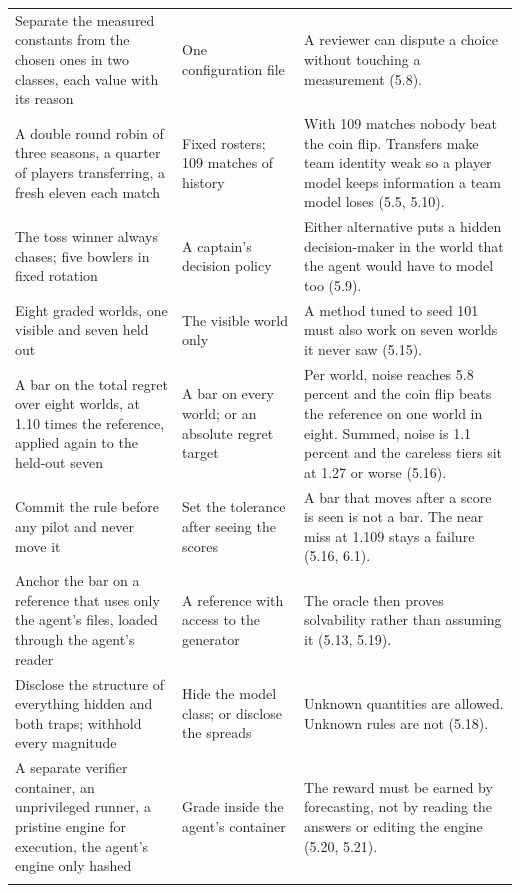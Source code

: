 \documentclass[11pt,letterpaper]{article}
\begin{document}
\begin{small}
\begin{longtable}{>{\raggedright\arraybackslash}p{}>{\raggedright\arraybackslash}p{}>{\raggedright\arraybackslash}p{}}
Separate the measured constants from the chosen ones in two classes, each value with its reason & One configuration file & A reviewer can dispute a choice without touching a measurement (5.8). \\ \addlinespace[2pt]
A double round robin of three seasons, a quarter of players transferring, a fresh eleven each match & Fixed rosters; 109 matches of history & With 109 matches nobody beat the coin flip. Transfers make team identity weak so a player model keeps information a team model loses (5.5, 5.10). \\ \addlinespace[2pt]
The toss winner always chases; five bowlers in fixed rotation & A captain's decision policy & Either alternative puts a hidden decision-maker in the world that the agent would have to model too (5.9). \\ \addlinespace[2pt]
Eight graded worlds, one visible and seven held out & The visible world only & A method tuned to seed 101 must also work on seven worlds it never saw (5.15). \\ \addlinespace[2pt]
A bar on the total regret over eight worlds, at 1.10 times the reference, applied again to the held-out seven & A bar on every world; or an absolute regret target & Per world, noise reaches 5.8 percent and the coin flip beats the reference on one world in eight. Summed, noise is 1.1 percent and the careless tiers sit at 1.27 or worse (5.16). \\ \addlinespace[2pt]
Commit the rule before any pilot and never move it & Set the tolerance after seeing the scores & A bar that moves after a score is seen is not a bar. The near miss at 1.109 stays a failure (5.16, 6.1). \\ \addlinespace[2pt]
Anchor the bar on a reference that uses only the agent's files, loaded through the agent's reader & A reference with access to the generator & The oracle then proves solvability rather than assuming it (5.13, 5.19). \\ \addlinespace[2pt]
Disclose the structure of everything hidden and both traps; withhold every magnitude & Hide the model class; or disclose the spreads & Unknown quantities are allowed. Unknown rules are not (5.18). \\ \addlinespace[2pt]
A separate verifier container, an unprivileged runner, a pristine engine for execution, the agent's engine only hashed & Grade inside the agent's container & The reward must be earned by forecasting, not by reading the answers or editing the engine (5.20, 5.21). \\ \addlinespace[2pt]

\end{longtable}
\end{small}
\end{document}
